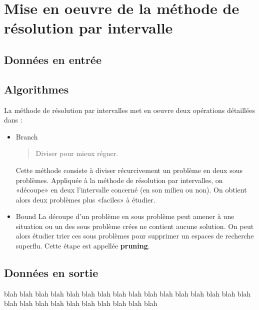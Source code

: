\section{Mise en oeuvre de la méthode de résolution par intervalle}


\subsection{Données en entrée}


\subsection{Algorithmes}
La méthode de résolution par intervalles met en oeuvre deux opérations détaillées dans \cite{Neumaier}: 
\begin{itemize}
\item{Branch}
\begin{quote} Diviser pour mieux régner. \end{quote} Cette méthode consiste à diviser récurcivement un problème en deux sous problèmes. Appliquée à la méthode de résolution par intervalles, on «découpe» en deux l'intervalle concerné (en son milieu ou non). On obtient alors deux problèmes plus «faciles» à étudier.
\item{Bound}
La découpe d'un problème en sous problème peut amener à une situation ou un des sous problème crées ne contient aucune solution. On peut alors étudier trier ces sous problèmes pour supprimer un espaces de recherche superflu. Cette étape est appellée \textbf{pruning}.
\end{itemize}


\subsection{Données en sortie}
 blah blah blah blah blah blah blah blah blah blah blah blah blah blah blah blah blah blah blah blah blah blah blah blah blah blah
